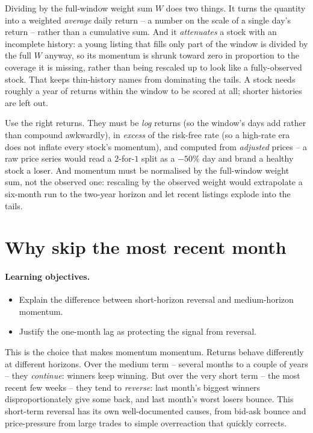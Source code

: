 \documentclass[11pt]{article}
\theoremstyle{definition}
\theoremstyle{plain}
\theoremstyle{remark}
\begin{document}
Dividing by the full-window weight sum $W$ does two things. It turns the quantity into a weighted \emph{average} daily return -- a number on the scale of a single day's return -- rather than a cumulative sum. And it \emph{attenuates} a stock with an incomplete history: a young listing that fills only part of the window is divided by the full $W$ anyway, so its momentum is shrunk toward zero in proportion to the coverage it is missing, rather than being rescaled up to look like a fully-observed stock. That keeps thin-history names from dominating the tails. A stock needs roughly a year of returns within the window to be scored at all; shorter histories are left out.

\begin{pitfall}
Use the right returns. They must be \emph{log} returns (so the window's days add rather than compound awkwardly), in \emph{excess} of the risk-free rate (so a high-rate era does not inflate every stock's momentum), and computed from \emph{adjusted} prices -- a raw price series would read a $2$-for-$1$ split as a $-50\%$ day and brand a healthy stock a loser. And momentum must be normalised by the full-window weight sum, not the observed one: rescaling by the observed weight would extrapolate a six-month run to the two-year horizon and let recent listings explode into the tails.
\end{pitfall}

\section{Why skip the most recent month}\label{sec:lag}

\paragraph{Learning objectives.}
\begin{itemize}[leftmargin=1.4em,topsep=2pt]
  \item Explain the difference between short-horizon reversal and medium-horizon momentum.
  \item Justify the one-month lag as protecting the signal from reversal.
\end{itemize}

This is the choice that makes momentum momentum. Returns behave differently at different horizons. Over the medium term -- several months to a couple of years -- they \emph{continue}: winners keep winning. But over the very short term -- the most recent few weeks -- they tend to \emph{reverse}: last month's biggest winners disproportionately give some back, and last month's worst losers bounce. This short-term reversal has its own well-documented causes, from bid-ask bounce and price-pressure from large trades to simple overreaction that quickly corrects.
\end{document}
